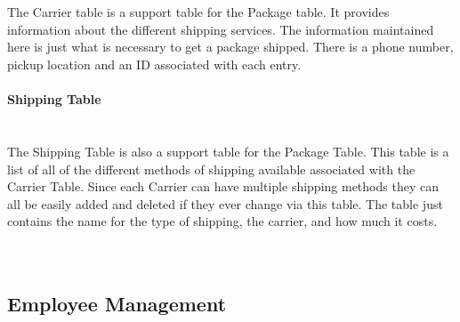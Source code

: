 \documentclass{report}
\begin{document}
    \\
    \\
    The Carrier table is a support table for the Package table. It provides information about the different
    shipping services. The information maintained here is just what is necessary to get a package shipped.
    There is a phone number, pickup location and an ID associated with each entry.
    \\
    \\
    {\bf Shipping Table}\\
    \\
    \\
    The Shipping Table is also a support table for the Package Table. This table is a list of all of the
    different methods of shipping available associated with the Carrier Table. Since each Carrier can
    have multiple shipping methods they can all be easily added and deleted if they ever change via
    this table. The table just contains the name for the type of shipping, the carrier, and how much
    it costs.\\
    \\
    \\
    \subsection{Employee Management}
\end{document}
